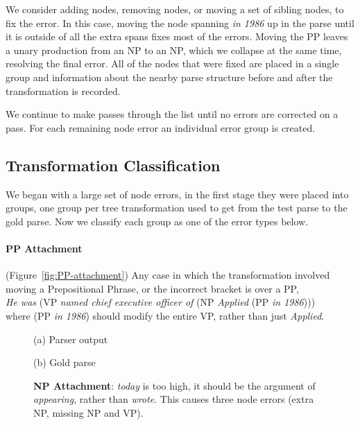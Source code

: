 We consider adding nodes, removing nodes, or moving a set of sibling nodes, to fix the error.
In this case, moving the node spanning \emph{in 1986} up in the parse until it is outside of all the extra spans fixes most of the errors.
Moving the PP leaves a unary production from an NP to an NP, which we collapse at the same time, resolving the final error.
All of the nodes that were fixed are placed in a single group and information about the nearby parse structure before and after the transformation is recorded.

We continue to make passes through the list until no errors are corrected on a pass.
For each remaining node error an individual error group is created.

\subsection{Transformation Classification}

We began with a large set of node errors, in the first stage they were placed into groups, one group per tree transformation used to get from the test parse to the gold parse.
Now we classify each group as one of the error types below.

\paragraph{PP Attachment} (Figure~\ref{fig:PP-attachment}) 
Any case in which the transformation involved moving a Prepositional Phrase, or the incorrect bracket is over a PP, \myeg \\ 
\emph{He was} (VP \emph{named chief executive officer of} (NP \emph{Applied} (PP \emph{in 1986}))) \\
where (PP \emph{in 1986}) should modify the entire VP, rather than just \emph{Applied}.

\begin{figure}
\begin{center}

\vspace{3mm}
(a) Parser output

\vspace{3mm}


(b) Gold parse
\end{center}
\derivspace
\caption[Error analysis example: NP Attachment.]{ \label{fig:NP-attachment} 
	\textbf{NP Attachment}: \emph{today} is too high, it should be the argument
	of \emph{appearing}, rather than \emph{wrote}.  This causes three node errors
	(extra NP, missing NP and VP).
}
\derivaftercompress
\end{figure}

